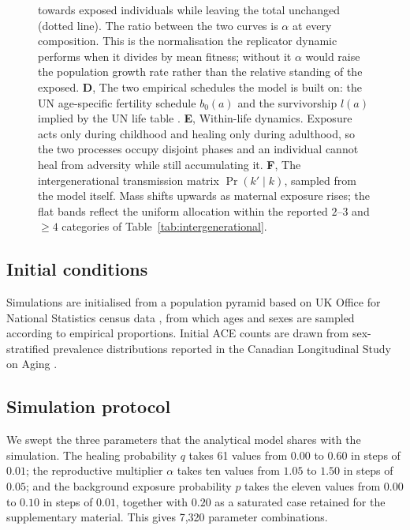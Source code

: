 \documentclass{article}
\begin{document}
\begin{figure}[!hbtp]
{towards exposed individuals while leaving the total unchanged (dotted line).
The ratio between the two curves is \(\alpha\) at every composition.  This is
the normalisation the replicator dynamic performs when it divides by mean
fitness; without it \(\alpha\) would raise the population growth rate rather
than the relative standing of the exposed.
\textbf{D}, The two empirical schedules the model is built on: the UN
age-specific fertility schedule \(b_0(a)\) \cite{un_wpp_fertility} and the
survivorship \(l(a)\) implied by the UN life table \cite{un_wpp_mortality}.
\textbf{E}, Within-life dynamics.  Exposure acts only during childhood and
healing only during adulthood, so the two processes occupy disjoint phases and
an individual cannot heal from adversity while still accumulating it.
\textbf{F}, The intergenerational transmission matrix
\(\Pr(k' \mid k)\), sampled from the model itself.  Mass shifts upwards as
maternal exposure rises; the flat bands reflect the uniform allocation within
the reported \(2\text{--}3\) and \(\geq 4\) categories of
Table~\ref{tab:intergenerational}.}
    \label{fig:model-specification}
\end{figure}

\subsection*{Initial conditions}

Simulations are initialised from a population pyramid based on UK Office for
National Statistics census data \cite{ons_population_pyramid}, from which ages
and sexes are sampled according to empirical proportions.  Initial ACE counts
are drawn from sex-stratified prevalence distributions reported in the Canadian
Longitudinal Study on Aging \cite{joshi2021prevalence}.

\subsection*{Simulation protocol}

We swept the three parameters that the analytical model shares with the
simulation.  The healing probability \(q\) takes 61 values from \(0.00\) to
\(0.60\) in steps of \(0.01\); the reproductive multiplier \(\alpha\) takes ten
values from \(1.05\) to \(1.50\) in steps of \(0.05\); and the background
exposure probability \(p\) takes the eleven values from \(0.00\) to \(0.10\) in
steps of \(0.01\), together with \(0.20\) as a saturated case retained for the
supplementary material.  This gives 7{,}320 parameter combinations.
\end{document}
